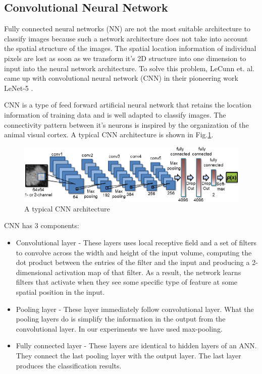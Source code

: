 \documentclass{article} %
\begin{document}
\subsection{Convolutional Neural Network}
Fully connected neural networks (NN) are not the most suitable architecture to classify images because such a network architecture does not take into account the spatial structure of the images. The spatial location information of individual pixels are lost as soon as we transform it's 2D structure into one dimension to input into the neural network architecture. To solve this problem, LeCunn et. al. came up with convolutional neural network (CNN) in their pioneering work LeNet-5 \cite{LeNet-5_paper}.
\par CNN is a type of feed forward artificial neural network that retains the location information of training data and is well adapted to classify images. The connectivity pattern between it's neurons is inspired by the organization of the animal visual cortex. A typical CNN architecture is shown in Fig.\ref{fig:typical_cnn}.

\begin{figure}[h]
\centering
\includegraphics[scale=0.3]{typical_cnn.png}
\caption{A typical CNN architecture}
\label{fig:typical_cnn}
\end{figure}

CNN has 3 components:

\begin{itemize}
\item
Convolutional layer - These layers uses local receptive field and a set of filters to convolve across the width and height of the input volume, computing the dot product between the entries of the filter and the input and producing a 2-dimensional activation map of that filter. As a result, the network learns filters that activate when they see some specific type of feature at some spatial position in the input.
\item
Pooling layer - These layer immediately follow convolutional layer. What the pooling layers do is simplify the information in the output from the convolutional layer. In our experiments we have used max-pooling.
\item
Fully connected layer - These layers are identical to hidden layers of an ANN. They connect the last pooling layer with the output layer. The last layer produces the classification results.
\end{itemize}
\end{document}
